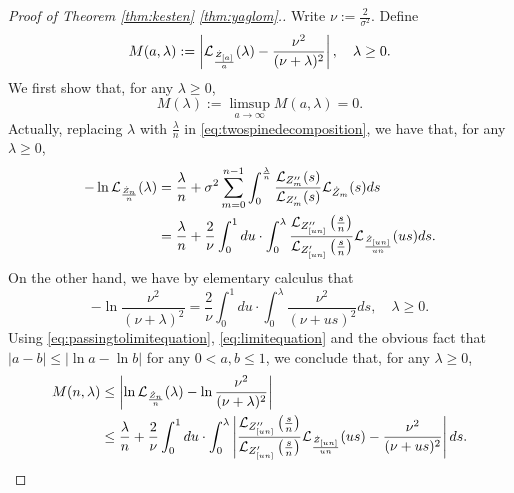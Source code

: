 \documentclass[12pt]{amsart}
\theoremstyle{remark}
\numberwithin{equation}{section}
\newcommand{\abs}[1]{\left| #1 \right|}
\newcommand{\expr}[1]{\left( #1 \right)}
\begin{document}
\medskip
\begin{proof}[Proof of   Theorem \ref{thm:kesten} \eqref{thm:yaglom}.]
	Write $\nu:=\frac{2}{\sigma^2}$. Define
\begin{equation}
		M(a,\lambda)
	:=
		\abs{\cL_{\frac{\dot Z_{[a]}}{a}}(\lambda)-
		\frac{\nu^2}{(\nu+\lambda)^2}},\quad\lambda \geq 0.
\end{equation}
We first show that, for any $\lambda\geq 0$,
\begin{equation}
\label{eq:Miszerofunction}
		M(\lambda)
	:=
		\limsup_{a\to\infty}M(a,\lambda)
	=
		0.
\end{equation}
	Actually, replacing $\lambda$ with $\frac{\lambda}{n}$ in \eqref{eq:twospinedecomposition}, we have that, for any $\lambda\geq 0$,
\begin{equation}
\label{eq:passingtolimitequation}
\begin{split}
		-\ln \cL_{\frac{\dot Z_n}{n}}(\lambda)
	&=
		\frac{\lambda}{n}+\sigma^2\sum_{m=0}^{n-1}\int_0^{\frac{\lambda}{n}} \frac{\cL_{Z''_m}(s)}{\cL_{Z'_m}(s)}\cL_{\dot Z_{m}}(s)ds
	\\&=
		\frac{\lambda}{n}+\frac{2}{\nu}\int_0^1 du \cdot \int_0^{\lambda} \frac{\cL_{Z''_{[un]}}\expr{\frac{s}{n}}}{\cL_{Z'_{[un]}}\expr{\frac{s}{n}}}\cL_{\frac{\dot Z_{[un]}}{un}}(us)ds.
\end{split}
\end{equation}
On the other hand, we have by elementary calculus that
\begin{equation}
\label{eq:limitequation}
        -\ln\frac{\nu^2}{(\nu+\lambda)^2}
    =
		\frac{2}{\nu}\int_0^1du\cdot\int_0^\lambda \frac{\nu^2}{(\nu+us)^2}ds,
\quad \lambda\geq 0.
\end{equation}
Using
\eqref{eq:passingtolimitequation}, \eqref{eq:limitequation} and the obvious fact that $\abs{a-b}\leq\abs{\ln a-\ln b}$ for any $0<a,b\leq 1$, we conclude that, for any $\lambda\geq 0$,
\begin{equation}
\label{eq:inequalitybeforepassingtolimit}
\begin{split}
        M(n,\lambda)
    &\leq
		\abs{\ln \cL_{\frac{\dot Z_n}{n}}(\lambda)-\ln\frac{\nu^2}{(\nu+\lambda)^2}}
	\\&\leq
		\frac{\lambda}{n}
	+
	    \frac{2}{\nu}\int_0^1 du
	\cdot
	    \int_0^{\lambda} \abs{\frac{\cL_{Z''_{[un]}}\expr{\frac{s}{n}}}{\cL_{Z'_{[un]}}\expr{\frac{s}{n}}}\cL_{\frac{\dot Z_{[un]}}{un}}(us)- \frac{\nu^2}{(\nu+us)^2}}ds.
\end{split}

\end{equation}
\end{proof}
\end{document}
